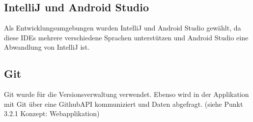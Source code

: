 \subsection{IntelliJ und Android Studio}
Als Entwicklungsumgebungen wurden IntelliJ und Android Studio gewählt, da diese IDEs mehrere verschiedene Sprachen unterstützen und Android Studio eine Abwandlung von IntelliJ ist.
\subsection{Git}
Git wurde für die Versionsverwaltung verwendet. Ebenso wird in der Applikation mit Git über eine GithubAPI kommuniziert und Daten abgefragt. (siehe Punkt 3.2.1 Konzept: Webapplikation)